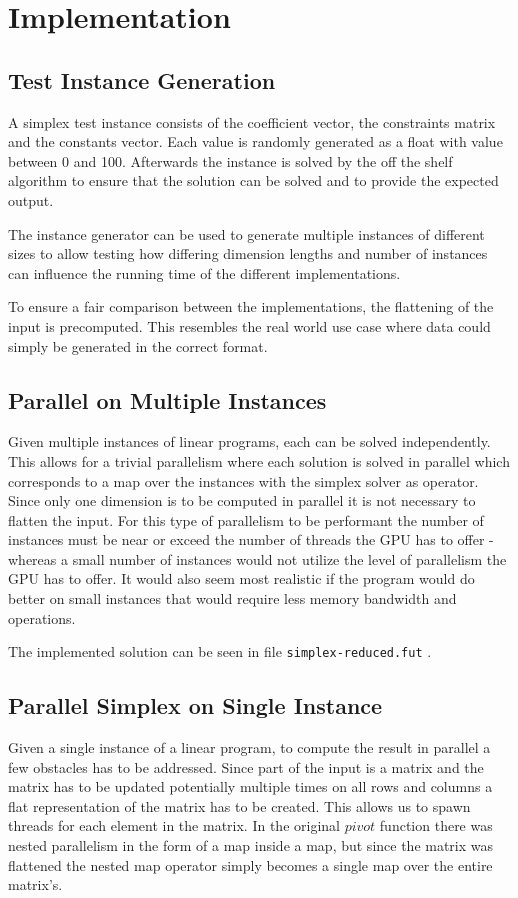 \section{Implementation}
\subsection{Test Instance Generation}
A simplex test instance consists of the coefficient vector, the constraints matrix and the constants vector. Each value is randomly generated as a float with value between 0 and 100. Afterwards the instance is solved by the off the shelf algorithm to ensure that the solution can be solved and to provide the expected output. 

The instance generator can be used to generate multiple instances of different sizes to allow testing how differing dimension lengths and number of instances can influence the running time of the different implementations.

To ensure a fair comparison between the implementations, the flattening of the input is precomputed. This resembles the real world use case where data could simply be generated in the correct format. 

\subsection{Parallel on Multiple Instances}
Given multiple instances of linear programs, each can be solved independently. This allows for a trivial parallelism where each solution is solved in parallel which corresponds to a map over the instances with the simplex solver as operator. Since only one dimension is to be computed in parallel it is not necessary to flatten the input. For this type of parallelism to be performant the number of instances must be near or exceed the number of threads the GPU has to offer - whereas a small number of instances would not utilize the level of parallelism the GPU has to offer. It would also seem most realistic if the program would do better on small instances that would require less memory bandwidth and operations.

The implemented solution can be seen in file \texttt{simplex-reduced.fut} .

\subsection{Parallel Simplex on Single Instance}
Given a single instance of a linear program, to compute the result in parallel a few obstacles has to be addressed. Since part of the input is a matrix and the matrix has to be updated potentially multiple times on all rows and columns a flat representation of the matrix has to be created. This allows us to spawn threads for each element in the matrix. In the original $pivot$ function there was nested parallelism in the form of a map inside a map, but since the matrix was flattened the nested map operator simply becomes a single map over the entire matrix's. 

